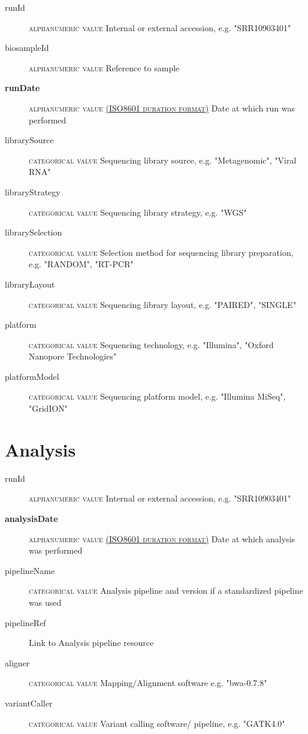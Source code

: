 \documentclass[a4paper, 10pt]{article}        %
\begin{document}
  \begin{description}
	\item[runId] {\textsc{alphanumeric value}}  Internal or external accession, e.g. "SRR10903401"
	\item[biosampleId] {\textsc{alphanumeric value}}  Reference to sample 
	\item[\textbf{runDate}] {\textsc{alphanumeric value \href{https://www.iso.org/iso-8601-date-and-time-format.html}{(ISO8601 duration format)}}} Date at which run was performed	
	\item[librarySource] {\textsc{categorical value}}  Sequencing library source, e.g. "Metagenomic", "Viral RNA"
	\item[libraryStrategy]  {\textsc{categorical value}} Sequencing library strategy, e.g. "WGS"
	\item[librarySelection] {\textsc{categorical value}} Selection method for sequencing library preparation, e.g. "RANDOM", "RT-PCR"
	\item[libraryLayout] {\textsc{categorical value}}  Sequencing library layout, e.g. "PAIRED", "SINGLE"
	\item[platform] {\textsc{categorical value}} Sequencing technology, e.g. "Illumina", "Oxford Nanopore Technologies"
	\item[platformModel] {\textsc{categorical value}} Sequencing platform model, e.g. "Illumina MiSeq", "GridION"
 \end{description}
 
 
 
   \section*{ {\color{teal} Analysis}}
  
  \begin{description}
	\item[runId] {\textsc{alphanumeric value}}  Internal or external accession, e.g. "SRR10903401"
	\item[\textbf{analysisDate}] {\textsc{alphanumeric value \href{https://www.iso.org/iso-8601-date-and-time-format.html}{(ISO8601 duration format)}}} Date at which analysis was performed  
	\item[pipelineName]  {\textsc{categorical value}} Analysis pipeline and version if a standardized pipeline was used
	\item[pipelineRef]  Link to Analysis pipeline resource
	\item[aligner]  {\textsc{categorical value}} Mapping/Alignment software e.g. "bwa-0.7.8"
	  \item[variantCaller]  {\textsc{categorical value}} Variant calling software/ pipeline, e.g. "GATK4.0" %
 \end{description}
 
\end{document}
